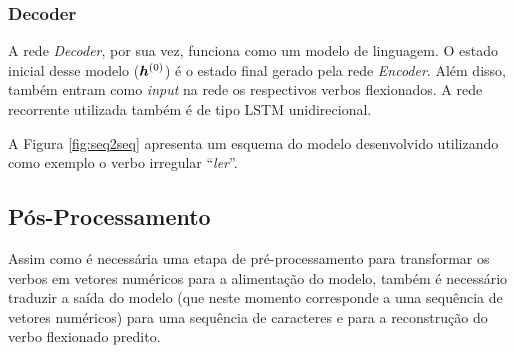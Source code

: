 \subsubsection{Decoder}

A rede \textit{Decoder}, por sua vez, funciona como um modelo de linguagem. O estado inicial desse modelo ($\bm{h}^{(0)}$) é o estado final gerado pela rede \textit{Encoder}. Além disso, também entram como \textit{input} na rede os respectivos verbos flexionados. A rede recorrente utilizada também é de tipo LSTM unidirecional.

A Figura \ref{fig:seq2seq} apresenta um esquema do modelo desenvolvido utilizando como exemplo o verbo irregular “\textit{ler}”.










 \subsection{Pós-Processamento}

Assim como é necessária uma etapa de pré-processamento para transformar os verbos em vetores numéricos para a alimentação do modelo, também é necessário traduzir a saída do modelo (que neste momento corresponde a uma sequência de vetores numéricos) para uma sequência de caracteres e para a reconstrução do verbo flexionado predito.

